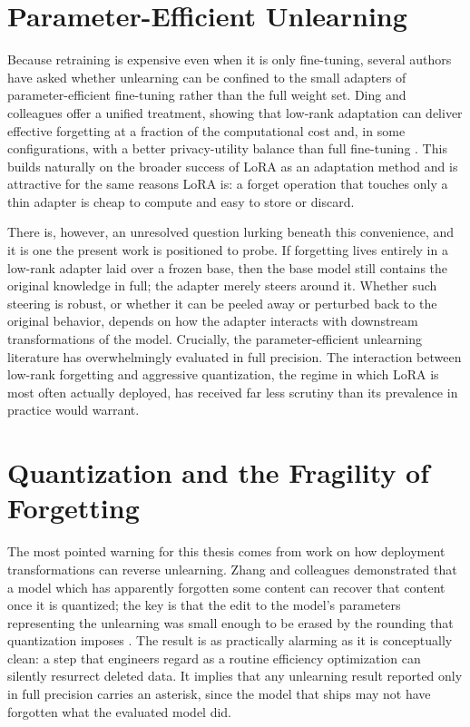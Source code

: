 \documentclass[a4paper,12pt]{report}
\begin{document}
\section{Parameter-Efficient Unlearning}
Because retraining is expensive even when it is only fine-tuning, several authors have asked whether unlearning can be confined to the small adapters of parameter-efficient fine-tuning rather than the full weight set. Ding and colleagues offer a unified treatment, showing that low-rank adaptation can deliver effective forgetting at a fraction of the computational cost and, in some configurations, with a better privacy-utility balance than full fine-tuning \parencite{ding2024peft}. This builds naturally on the broader success of LoRA as an adaptation method \parencite{hu2022lora} and is attractive for the same reasons LoRA is: a forget operation that touches only a thin adapter is cheap to compute and easy to store or discard.

There is, however, an unresolved question lurking beneath this convenience, and it is one the present work is positioned to probe. If forgetting lives entirely in a low-rank adapter laid over a frozen base, then the base model still contains the original knowledge in full; the adapter merely steers around it. Whether such steering is robust, or whether it can be peeled away or perturbed back to the original behavior, depends on how the adapter interacts with downstream transformations of the model. Crucially, the parameter-efficient unlearning literature has overwhelmingly evaluated in full precision. The interaction between low-rank forgetting and aggressive quantization, the regime in which LoRA is most often actually deployed, has received far less scrutiny than its prevalence in practice would warrant.

\section{Quantization and the Fragility of Forgetting}
The most pointed warning for this thesis comes from work on how deployment transformations can reverse unlearning. Zhang and colleagues demonstrated that a model which has apparently forgotten some content can recover that content once it is quantized; the key is that the edit to the model's parameters representing the unlearning was small enough to be erased by the rounding that quantization imposes \parencite{zhang2024quantization}. The result is as practically alarming as it is conceptually clean: a step that engineers regard as a routine efficiency optimization can silently resurrect deleted data. It implies that any unlearning result reported only in full precision carries an asterisk, since the model that ships may not have forgotten what the evaluated model did.
\end{document}
